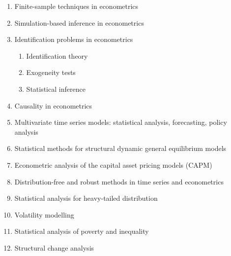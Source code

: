\documentclass[titlepage,11pt,amstex]{article}
\begin{document}
\begin{enumerate}
\item Finite-sample techniques in econometrics

\item Simulation-based inference in econometrics

\item Identification problems in econometrics

\begin{enumerate}
\item Identification theory

\item Exogeneity tests

\item Statistical inference
\end{enumerate}

\item Causality in econometrics

\item Multivariate time series models: statistical analysis, forecasting,
policy analysis

\item Statistical methods for structural dynamic general equilibrium models

\item Econometric analysis of the capital asset pricing models (CAPM)

\item Distribution-free and robust methods in time series and econometrics

\item Statistical analysis for heavy-tailed distribution

\item Volatility modelling

\item Statistical analysis of poverty and inequality

\item Structural change analysis
\end{enumerate}

\begin{comment}

\newpage \textbf{Bibliographie g\'{e}n\'{e}rale / General bibliography}

\begin{center}
\quad
\end{center}

\quad

\bbibunitu\bbibunit

\ebibunit\ebibunitu

\quad

\end{comment}

\newpage



\end{document}
